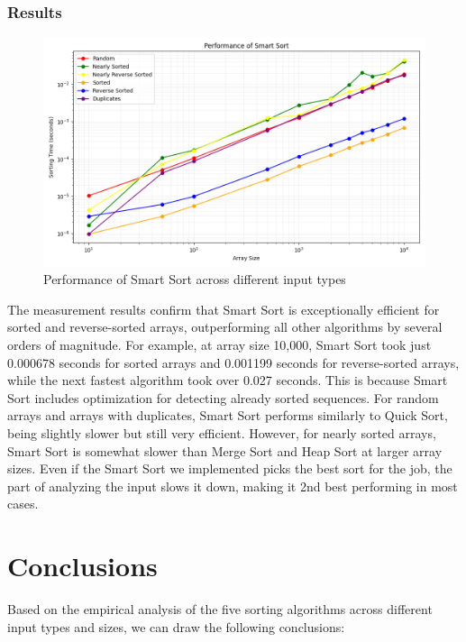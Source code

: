 \documentclass[a4paper,12pt]{article}
\begin{document}
\subsubsection{Results}
\label{sec:org2e46eef}
\begin{figure}[htbp]
\centering
\includegraphics[width=.9\linewidth]{sorting_performance_smart_sort.png}
\caption{\label{fig:orgf3a7cb5}Performance of Smart Sort across different input types}
\end{figure}

The measurement results confirm that Smart Sort is exceptionally efficient for sorted and reverse-sorted arrays, outperforming all other algorithms by several orders of magnitude. For example, at array size 10,000, Smart Sort took just 0.000678 seconds for sorted arrays and 0.001199 seconds for reverse-sorted arrays, while the next fastest algorithm took over 0.027 seconds. This is because Smart Sort includes optimization for detecting already sorted sequences. For random arrays and arrays with duplicates, Smart Sort performs similarly to Quick Sort, being slightly slower but still very efficient. However, for nearly sorted arrays, Smart Sort is somewhat slower than Merge Sort and Heap Sort at larger array sizes.
Even if the Smart Sort we implemented picks the best sort for the job, the part of analyzing the input slows it down, making it 2nd best performing in most cases.
\section{Conclusions}
\label{sec:orgcaa627c}

Based on the empirical analysis of the five sorting algorithms across different input types and sizes, we can draw the following conclusions:
\end{document}
